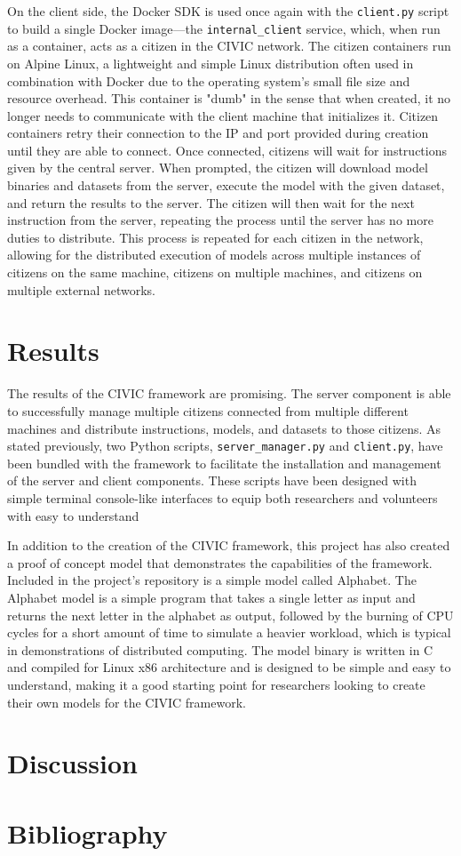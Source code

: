 \documentclass[11pt]{article}
\begin{document}
On the client side, the Docker SDK is used once again with the \verb|client.py| script to build a single Docker image---the \verb|internal_client| service, which, when run as a container, acts as a citizen in the CIVIC network. The citizen containers run on Alpine Linux, a lightweight and simple Linux distribution often used in combination with Docker due to the operating system's small file size and resource overhead. This container is "dumb" in the sense that when created, it no longer needs to communicate with the client machine that initializes it. Citizen containers retry their connection to the IP and port provided during creation until they are able to connect. Once connected, citizens will wait for instructions given by the central server. When prompted, the citizen will download model binaries and datasets from the server, execute the model with the given dataset, and return the results to the server. The citizen will then wait for the next instruction from the server, repeating the process until the server has no more duties to distribute. This process is repeated for each citizen in the network, allowing for the distributed execution of models across multiple instances of citizens on the same machine, citizens on multiple machines, and citizens on multiple external networks. 


\section{Results}

The results of the CIVIC framework are promising. The server component is able to successfully manage multiple citizens connected from multiple different machines and distribute instructions, models, and datasets to those citizens. As stated previously, two Python scripts, \verb|server_manager.py| and \verb|client.py|, have been bundled with the framework to facilitate the installation and management of the server and client components. These scripts have been designed with simple terminal console-like interfaces to equip both researchers and volunteers with easy to understand 

In addition to the creation of the CIVIC framework, this project has also created a proof of concept model that demonstrates the capabilities of the framework. Included in the project's repository is a simple model called Alphabet. The Alphabet model is a simple program that takes a single letter as input and returns the next letter in the alphabet as output, followed by the burning of CPU cycles for a short amount of time to simulate a heavier workload, which is typical in demonstrations of distributed computing. The model binary is written in C and compiled for Linux x86 architecture and is designed to be simple and easy to understand, making it a good starting point for researchers looking to create their own models for the CIVIC framework.


\section{Discussion}

\section{Bibliography}
\end{document}
